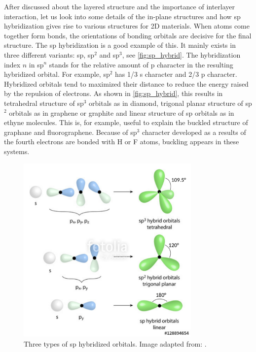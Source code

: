 After discussed about the layered structure and the importance of interlayer interaction, let us look into some details of the in-plane structures and how sp hybridization gives rise to various structures for 2D materials. When atoms come together form bonds, the orientations of bonding orbitals are decisive for the final structure. The sp hybridization is a good example of this.  It mainly exists in three different variants: sp, sp$^2$ and sp$^3$, see \autoref{fig:sp_hybrid}. The hybridization index $n$ in sp$^n$ stands for the relative amount of p character in the resulting hybridized orbital. For example, sp$^2$ has 1/3 s character and 2/3 p character. Hybridized orbitals tend to maximized their distance to reduce the energy raised by the repulsion of electrons. As shown in \autoref{fig:sp_hybrid}, this results in tetrahedral structure of sp$^3$ orbitals as in diamond, trigonal planar structure of sp$^2$ orbitals as in graphene or graphite and linear structure of sp orbitals as in ethyne molecules.  This is, for example, useful to explain the buckled structure of graphane and fluorographene. Because of sp$^3$ character developed as a results of the fourth electrons are bonded with H or F atoms, buckling appears in these systems. 

\begin{figure}[htbp!] 
\centering  
\includegraphics[width=0.8\textwidth]{sp_hybrid.png}
\caption{Three types of sp hybridized orbitals. Image adapted from: \cite{sp_hybrid}. }  
\label{fig:sp_hybrid}
\end{figure} 

